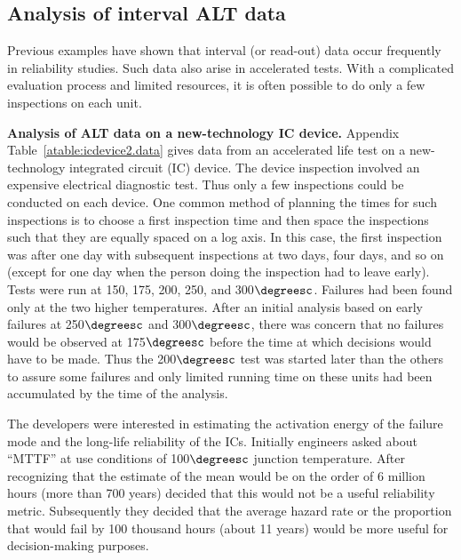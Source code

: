 \subsection{Analysis of interval ALT data}
\label{section:interval.data.alt}
Previous examples have shown that interval (or read-out) data occur
frequently in reliability studies.  Such data also arise in
accelerated tests. With a complicated evaluation process and limited
resources, it is often possible to do only a few inspections on each
unit.
\begin{example}
{\bf Analysis of ALT data on a new-technology IC device.}
\label{example:new.tech.ic}
Appendix Table~\ref{atable:icdevice2.data} gives data from an
accelerated life test on a new-technology integrated circuit (IC)
device. The device inspection involved an expensive electrical
diagnostic test.  Thus only a few inspections could be conducted on
each device. One common method of planning the times for such
inspections is to choose a first inspection time and then space the
inspections such that they are equally spaced on a log axis. In this
case, the first inspection was after one day with subsequent
inspections at two days, four days, and so on (except for one day
when the person doing the inspection had to leave early). Tests were
run at 150, 175, 200, 250, and 300$\degreesc$.  Failures had been
found only at the two higher temperatures.  After an initial
analysis based on early failures at 250$\degreesc$ and
300$\degreesc$, there was concern that no failures would be observed
at 175$\degreesc$ before the time at which decisions would have to
be made. Thus the 200$\degreesc$ test was started later than the
others to assure some failures and only limited running time on
these units had been accumulated by the time of the analysis.

The developers were interested in estimating the activation energy
of the failure mode and the long-life reliability of the
ICs. Initially engineers asked about ``MTTF'' at use conditions of
100$\degreesc$ junction temperature. After recognizing that the
estimate of the mean would be on the order of 6 million hours (more
than 700 years) decided that this would not be a useful reliability
metric. Subsequently they decided that the average hazard rate or
the proportion that would fail by 100 thousand hours (about 11
years) would be more useful for decision-making purposes.


\end{example}
